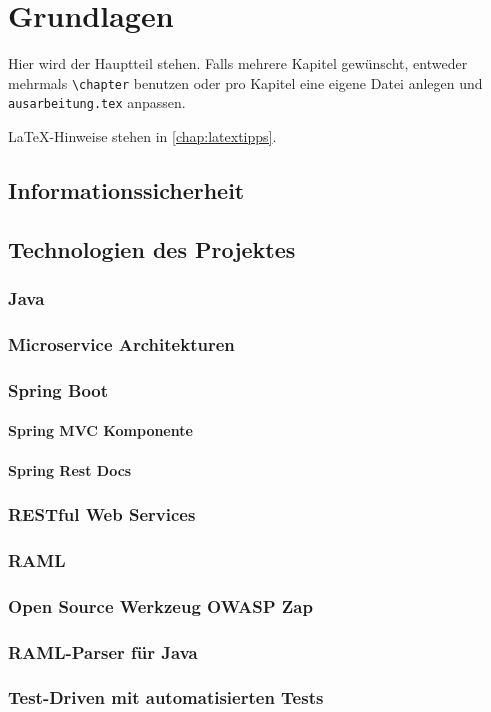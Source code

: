 \chapter{Grundlagen}
\label{chap:k2}

Hier wird der Hauptteil stehen. Falls mehrere Kapitel gewünscht, entweder mehrmals \texttt{\textbackslash{}chapter} benutzen oder pro Kapitel eine eigene Datei anlegen und \texttt{ausarbeitung.tex} anpassen.

LaTeX-Hinweise stehen in \cref{chap:latextipps}.

\section{Informationssicherheit}

\section{Technologien des Projektes}

\subsection{Java}

\subsection{Microservice Architekturen}

\subsection{Spring Boot}

\subsubsection{Spring MVC Komponente}

\subsubsection{Spring Rest Docs}

\subsection{RESTful Web Services}

\subsection{RAML}

\subsection{Open Source Werkzeug OWASP Zap}

\subsection{RAML-Parser für Java}

\subsection{Test-Driven mit automatisierten Tests}

